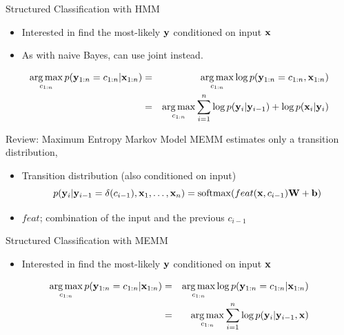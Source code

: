 \documentclass{beamer}
\begin{document}
\begin{frame}{Structured Classification with HMM}

  \begin{itemize}
  \item Interested in find the most-likely $\mathbf{y}$ conditioned 
  on input $\mathbf{x}$
  \air 

  \item As with naive Bayes, can use joint instead.
  \end{itemize}
 
  \begin{eqnarray*}
     \argmax_{c_{1:n}} p(\boldy_{1:n} = c_{1:n}|  \boldx_{1:n}) &=& \argmax_{c_{1:n}} \log p(\boldy_{1:n} = c_{1:n},  \boldx_{1:n})    \\
    &=& \argmax_{c_{1:n}} \sum_{i=1}^n \log p(\boldy_i | \boldy_{i-1}) + \log p(\boldx_i | \boldy_i )
  \end{eqnarray*}

\end{frame}



\begin{frame}{Review: Maximum Entropy Markov Model}
  MEMM estimates only a transition distribution,
  \begin{itemize}
  \item Transition distribution (also conditioned on input)
    \[p(\boldy_i | \boldy_{i-1}=\delta(c_{i-1}), \boldx_1, \ldots, \boldx_n) = \softmax(feat(\boldx, c_{i-1}) \boldW + \boldb) \]

  \item $feat$;  combination of the input and the previous $c_{i-1}$   
  \end{itemize}
\end{frame}


\begin{frame}{Structured Classification with MEMM}

  \begin{itemize}
  \item Interested in find the most-likely $\mathbf{y}$ conditioned 
  on input $\mathbf{x}$
  \end{itemize}
 
  \begin{eqnarray*}
     \argmax_{c_{1:n}} p(\boldy_{1:n} = c_{1:n}|  \boldx_{1:n}) &=& \argmax_{c_{1:n}} \log p(\boldy_{1:n} = c_{1:n}|  \boldx_{1:n})    \\
    &=& \argmax_{c_{1:n}} \sum_{i=1}^n \log p(\boldy_i | \boldy_{i-1}, \boldx)
  \end{eqnarray*}
\end{frame}
\end{document}
